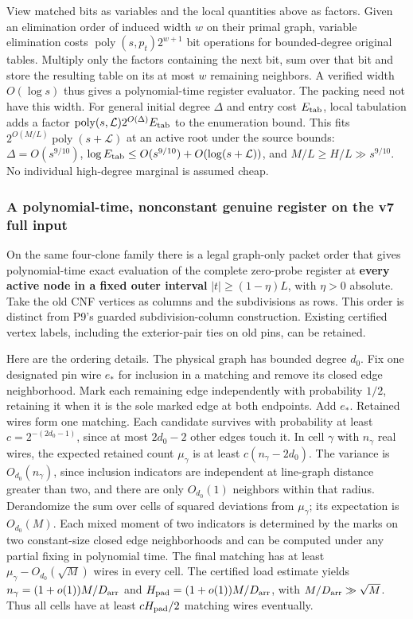 \documentclass[11pt,a4paper]{article}
\begin{document}
View matched bits as variables and the local quantities above as
factors. Given an elimination order of induced width \(w\) on their
primal graph, variable elimination costs
\(\operatorname{poly}(s,p_t)2^{w+1}\) bit operations for bounded-degree
original tables. Multiply only the factors containing the next bit, sum
over that bit and store the resulting table on its at most \(w\)
remaining neighbors. A verified width \(O(\log s)\) thus gives a
polynomial-time register evaluator. The packing need not have this
width. For general initial degree \(\Delta\) and entry cost
\(E_{\rm tab}\), local tabulation adds a factor
\(\operatorname{poly}(s,\mathcal L)2^{O(\Delta)}E_{\rm tab}\) to the
enumeration bound. This fits
\(2^{O(M/L)}\operatorname{poly}(s+\mathcal L)\) at an active root under
the source bounds: \(\Delta=O(s^{9/10})\),
\(\log E_{\rm tab}\le O(s^{9/10})+O(\log(s+\mathcal L))\), and
\(M/L\ge H/L\gg s^{9/10}\). No individual high-degree marginal is
assumed cheap.

\subsubsection{A polynomial-time, nonconstant genuine register on the v7
full
input}\label{v9-a-polynomial-time-nonconstant-genuine-register-on-the-v7-full-input}

On the same four-clone family there is a legal graph-only packet order
that gives polynomial-time exact evaluation of the complete zero-probe
register at \textbf{every active node in a fixed outer interval}
\(|t|\ge(1-\eta)L\), with \(\eta>0\) absolute. Take the old CNF vertices
as columns and the subdivisions as rows. This order is distinct from
P9's guarded subdivision-column construction. Existing certified vertex
labels, including the exterior-pair ties on old pins, can be retained.

Here are the ordering details. The physical graph has bounded degree
\(d_0\). Fix one designated pin wire \(e_*\) for inclusion in a matching
and remove its closed edge neighborhood. Mark each remaining edge
independently with probability \(1/2\), retaining it when it is the sole
marked edge at both endpoints. Add \(e_*\). Retained wires form one
matching. Each candidate survives with probability at least
\(c=2^{-(2d_0-1)}\), since at most \(2d_0-2\) other edges touch it. In
cell \(\gamma\) with \(n_\gamma\) real wires, the expected retained
count \(\mu_\gamma\) is at least \(c(n_\gamma-2d_0)\). The variance is
\(O_{d_0}(n_\gamma)\), since inclusion indicators are independent at
line-graph distance greater than two, and there are only \(O_{d_0}(1)\)
neighbors within that radius. Derandomize the sum over cells of squared
deviations from \(\mu_\gamma\); its expectation is \(O_{d_0}(M)\). Each
mixed moment of two indicators is determined by the marks on two
constant-size closed edge neighborhoods and can be computed under any
partial fixing in polynomial time. The final matching has at least
\(\mu_\gamma-O_{d_0}(\sqrt M)\) wires in every cell. The certified load
estimate yields \(n_\gamma=(1+o(1))M/D_{\rm arr}\) and
\(H_{\rm pad}=(1+o(1))M/D_{\rm arr}\), with \(M/D_{\rm arr}\gg\sqrt M\).
Thus all cells have at least \(c H_{\rm pad}/2\) matching wires
eventually.
\end{document}
